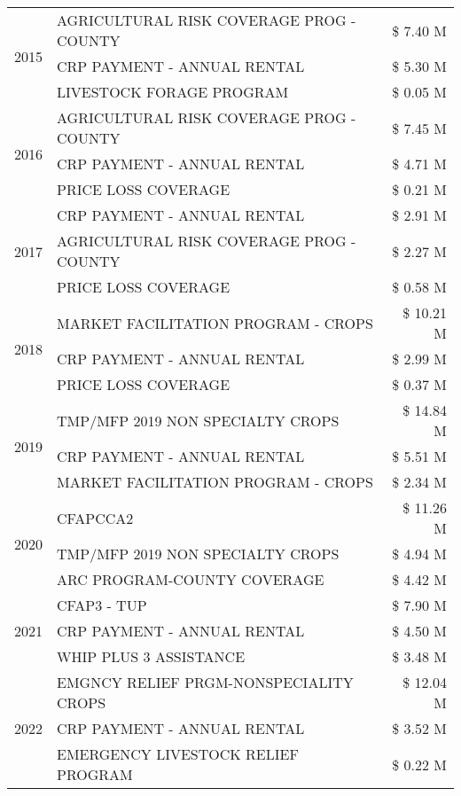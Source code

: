 \begin{tabular}{llr}
\multirow[t]{3}{*}{2015} & AGRICULTURAL RISK COVERAGE PROG - COUNTY & \$ 7.40 M \\
 & CRP PAYMENT - ANNUAL RENTAL & \$ 5.30 M \\
 & LIVESTOCK FORAGE PROGRAM & \$ 0.05 M \\
\cline{1-3}
\multirow[t]{3}{*}{2016} & AGRICULTURAL RISK COVERAGE PROG - COUNTY & \$ 7.45 M \\
 & CRP PAYMENT - ANNUAL RENTAL & \$ 4.71 M \\
 & PRICE LOSS COVERAGE & \$ 0.21 M \\
\cline{1-3}
\multirow[t]{3}{*}{2017} & CRP PAYMENT - ANNUAL RENTAL & \$ 2.91 M \\
 & AGRICULTURAL RISK COVERAGE PROG - COUNTY & \$ 2.27 M \\
 & PRICE LOSS COVERAGE & \$ 0.58 M \\
\cline{1-3}
\multirow[t]{3}{*}{2018} & MARKET FACILITATION PROGRAM - CROPS & \$ 10.21 M \\
 & CRP PAYMENT - ANNUAL RENTAL & \$ 2.99 M \\
 & PRICE LOSS COVERAGE & \$ 0.37 M \\
\cline{1-3}
\multirow[t]{3}{*}{2019} & TMP/MFP 2019 NON SPECIALTY CROPS & \$ 14.84 M \\
 & CRP PAYMENT - ANNUAL RENTAL & \$ 5.51 M \\
 & MARKET FACILITATION PROGRAM - CROPS & \$ 2.34 M \\
\cline{1-3}
\multirow[t]{3}{*}{2020} & CFAPCCA2 & \$ 11.26 M \\
 & TMP/MFP 2019 NON SPECIALTY CROPS & \$ 4.94 M \\
 & ARC PROGRAM-COUNTY COVERAGE & \$ 4.42 M \\
\cline{1-3}
\multirow[t]{3}{*}{2021} & CFAP3 - TUP & \$ 7.90 M \\
 & CRP PAYMENT - ANNUAL RENTAL & \$ 4.50 M \\
 & WHIP PLUS 3 ASSISTANCE & \$ 3.48 M \\
\cline{1-3}
\multirow[t]{3}{*}{2022} & EMGNCY RELIEF PRGM-NONSPECIALITY CROPS & \$ 12.04 M \\
 & CRP PAYMENT - ANNUAL RENTAL & \$ 3.52 M \\
 & EMERGENCY LIVESTOCK RELIEF PROGRAM & \$ 0.22 M \\
\cline{1-3}
\bottomrule
\end{tabular}
